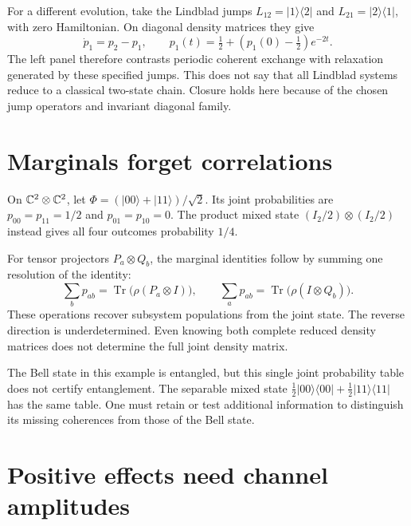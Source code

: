For a different evolution, take the Lindblad jumps $L_{12}=|1\rangle\langle2|$ and $L_{21}=|2\rangle\langle1|$, with zero Hamiltonian. On diagonal density matrices they give
\[
\dot p_1=p_2-p_1,\qquad
p_1(t)=\tfrac12+(p_1(0)-\tfrac12)e^{-2t}.
\]
The left panel therefore contrasts periodic coherent exchange with relaxation generated by these specified jumps. This does not say that all Lindblad systems reduce to a classical two-state chain. Closure holds here because of the chosen jump operators and invariant diagonal family.



\clearpage
\section{Marginals forget correlations}

On $\mathbb C^2\otimes\mathbb C^2$, let $\Phi=(|00\rangle+|11\rangle)/\sqrt2$. Its joint probabilities are $p_{00}=p_{11}=1/2$ and $p_{01}=p_{10}=0$. The product mixed state $(I_2/2)\otimes(I_2/2)$ instead gives all four outcomes probability $1/4$.

For tensor projectors $P_a\otimes Q_b$, the marginal identities follow by summing one resolution of the identity:
\[
\sum_b p_{ab}=\operatorname{Tr}\bigl(\rho(P_a\otimes I)\bigr),\qquad
\sum_a p_{ab}=\operatorname{Tr}\bigl(\rho(I\otimes Q_b)\bigr).
\]
These operations recover subsystem populations from the joint state. The reverse direction is underdetermined. Even knowing both complete reduced density matrices does not determine the full joint density matrix.

The Bell state in this example is entangled, but this single joint probability table does not certify entanglement. The separable mixed state $\tfrac12|00\rangle\langle00|+\tfrac12|11\rangle\langle11|$ has the same table. One must retain or test additional information to distinguish its missing coherences from those of the Bell state.



\clearpage
\section{Positive effects need channel amplitudes}

